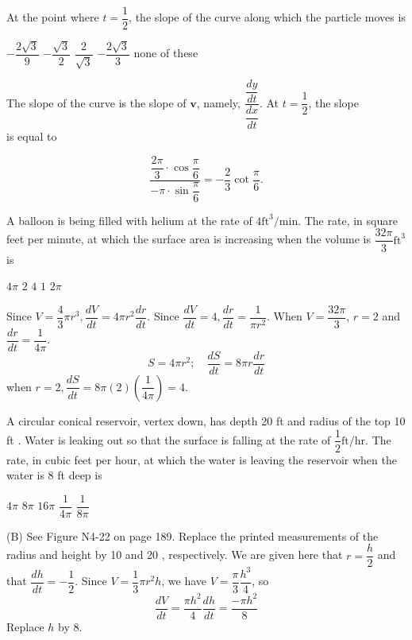 \newpage




\question\label{calc04:vector-last}
At the point where $t=\dfrac{1}{2}$, the slope of the curve along which the particle moves is
\begin{choices}
  \choice $-\dfrac{2 \sqrt{3}}{9}$
  \choice $-\dfrac{\sqrt{3}}{2}$
  \choice $\dfrac{2}{\sqrt{3}}$
  \CorrectChoice $-\dfrac{2 \sqrt{3}}{3}$
  \choice none of these
\end{choices}
\begin{solution}
The slope of the curve is the slope of $\mathbf{v}$, namely, $\dfrac{\dfrac{d y}{d t}}{\dfrac{d x}{d t}}$. At $t=\dfrac{1}{2}$, the slope\\
is equal to


\[
\dfrac{\dfrac{2 \pi}{3} \cdot \cos \dfrac{\pi}{6}}{-\pi \cdot \sin \dfrac{\pi}{6}}=-\dfrac{2}{3} \cot \dfrac{\pi}{6} .
\]


  \setcounter{enumi}{30}
\end{solution}

\question
A balloon is being filled with helium at the rate of $4 \mathrm{ft}^{3} / \mathrm{min}$. The rate, in square feet per minute, at which the surface area is increasing when the volume is $\dfrac{32 \pi}{3} \mathrm{ft}^{3}$ is
\begin{choices}
  \choice $4 \pi$
  \choice $2$
  \CorrectChoice $4$
  \choice $1$
  \choice $2 \pi$
\end{choices}
\begin{solution}
Since $V=\dfrac{4}{3} \pi r^{3}, \dfrac{d V}{d t}=4 \pi r^{2} \dfrac{d r}{d t}$. Since $\dfrac{d V}{d t}=4, \dfrac{d r}{d t}=\dfrac{1}{\pi r^{2}}$. When $V=\dfrac{32 \pi}{3}$, $r=2$ and $\dfrac{d r}{d t}=\dfrac{1}{4 \pi}$.
\[
S=4 \pi r^{2} ; \quad \dfrac{d S}{d t}=8 \pi r \dfrac{d r}{d t}
\]
when $r=2, \dfrac{d S}{d t}=8 \pi(2)\left(\dfrac{1}{4 \pi}\right)=4$.
\end{solution}





\newpage




\question
A circular conical reservoir, vertex down, has depth 20 ft and radius of the top 10 ft . Water is leaking out so that the surface is falling at the rate of $\dfrac{1}{2} \mathrm{ft} / \mathrm{hr}$. The rate, in cubic feet per hour, at which the water is leaving the reservoir when the water is 8 ft deep is
\begin{choices}
  \choice $4 \pi$
  \CorrectChoice $8 \pi$
  \choice $16 \pi$
  \choice $\dfrac{1}{4 \pi}$
  \choice $\dfrac{1}{8 \pi}$
\end{choices}
\begin{solution}
(B) See Figure N4-22 on page 189. Replace the printed measurements of the radius and height by 10 and 20 , respectively. We are given here that $r=\dfrac{h}{2}$ and that $\dfrac{d h}{d t}=-\dfrac{1}{2}$. Since $V=\dfrac{1}{3} \pi r^{2} h$, we have $V=\dfrac{\pi}{3} \dfrac{h^{3}}{4}$, so
\[
\dfrac{d V}{d t}=\dfrac{\pi h^{2}}{4} \dfrac{d h}{d t}=\dfrac{-\pi h^{2}}{8}
\]
Replace $h$ by 8.
\end{solution}

